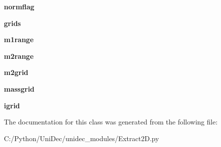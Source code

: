 \begin{DoxyCompactItemize}
\item 
\hypertarget{class_uni_dec_1_1unidec__modules_1_1_extract2_d_1_1_extract2_d_plot_a752f4257f6d898b8d725eb831c6aea47}{}{\bfseries normflag}\label{class_uni_dec_1_1unidec__modules_1_1_extract2_d_1_1_extract2_d_plot_a752f4257f6d898b8d725eb831c6aea47}

\item 
\hypertarget{class_uni_dec_1_1unidec__modules_1_1_extract2_d_1_1_extract2_d_plot_a1b2ef554a9779a3560d8242dc86d0f8a}{}{\bfseries grids}\label{class_uni_dec_1_1unidec__modules_1_1_extract2_d_1_1_extract2_d_plot_a1b2ef554a9779a3560d8242dc86d0f8a}

\item 
\hypertarget{class_uni_dec_1_1unidec__modules_1_1_extract2_d_1_1_extract2_d_plot_a282030dacd64ab3d6be9ffce2e1f91d1}{}{\bfseries m1range}\label{class_uni_dec_1_1unidec__modules_1_1_extract2_d_1_1_extract2_d_plot_a282030dacd64ab3d6be9ffce2e1f91d1}

\item 
\hypertarget{class_uni_dec_1_1unidec__modules_1_1_extract2_d_1_1_extract2_d_plot_aa7c0ad90523690176dcaf736bc1f6c5f}{}{\bfseries m2range}\label{class_uni_dec_1_1unidec__modules_1_1_extract2_d_1_1_extract2_d_plot_aa7c0ad90523690176dcaf736bc1f6c5f}

\item 
\hypertarget{class_uni_dec_1_1unidec__modules_1_1_extract2_d_1_1_extract2_d_plot_a95e5b40817bc79984580ae9f336b2197}{}{\bfseries m2grid}\label{class_uni_dec_1_1unidec__modules_1_1_extract2_d_1_1_extract2_d_plot_a95e5b40817bc79984580ae9f336b2197}

\item 
\hypertarget{class_uni_dec_1_1unidec__modules_1_1_extract2_d_1_1_extract2_d_plot_a88339eba3a529c1025f6f3f891cdec5d}{}{\bfseries massgrid}\label{class_uni_dec_1_1unidec__modules_1_1_extract2_d_1_1_extract2_d_plot_a88339eba3a529c1025f6f3f891cdec5d}

\item 
\hypertarget{class_uni_dec_1_1unidec__modules_1_1_extract2_d_1_1_extract2_d_plot_a253bea8b29e8b03c936bd1c58c9c894d}{}{\bfseries igrid}\label{class_uni_dec_1_1unidec__modules_1_1_extract2_d_1_1_extract2_d_plot_a253bea8b29e8b03c936bd1c58c9c894d}

\end{DoxyCompactItemize}


The documentation for this class was generated from the following file\+:\begin{DoxyCompactItemize}
\item 
C\+:/\+Python/\+Uni\+Dec/unidec\+\_\+modules/Extract2\+D.\+py\end{DoxyCompactItemize}
